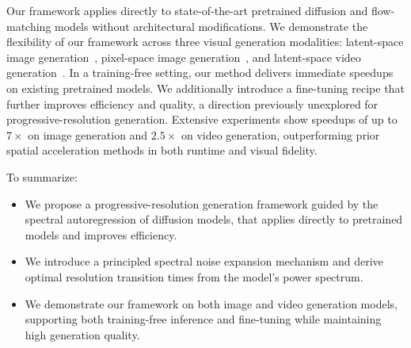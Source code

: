 Our framework applies directly to state-of-the-art pretrained diffusion and flow-matching models without architectural modifications. We demonstrate the flexibility of our framework across three visual generation modalities: latent-space image generation~\cite{black2024flux, zimage}, pixel-space image generation~\cite{pixelgen}, and latent-space video generation~\cite{wan}. In a training-free setting, our method delivers immediate speedups on existing pretrained models. We additionally introduce a fine-tuning recipe that further improves efficiency and quality, a direction previously unexplored for progressive-resolution generation. Extensive experiments show speedups of up to $7\times$ on image generation and $2.5\times$ on video generation, outperforming prior spatial acceleration methods in both runtime and visual fidelity.

To summarize: \vspace{-3pt}
\begin{itemize}
\item We propose a progressive-resolution generation framework guided by the spectral autoregression of diffusion models, that applies directly to pretrained models and improves efficiency.
\item We introduce a principled spectral noise expansion mechanism and derive optimal resolution transition times from the model's power spectrum.
\item We demonstrate our framework on both image and video generation models, supporting both training-free inference and fine-tuning while maintaining high generation quality.
\end{itemize}






